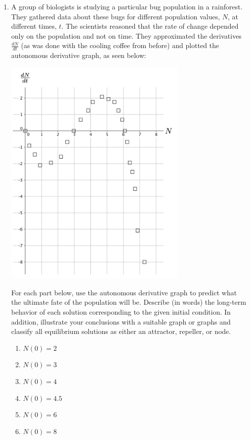 \begin{enumerate}[resume]
\item A group of biologists is studying a particular bug population in a rainforest. They gathered data about these bugs for different population values, $N$, at different times, $t$. The scientists reasoned that the rate of change depended only on the population and not on time. They approximated the derivatives $\frac{dN}{dt}$ (as was done with the cooling coffee from before) and plotted the autonomous derivative graph, as seen below: \label{07problem9}
\begin{center}
\includegraphics[width=3.5in]{07/07Bugs1.png}
\end{center}
For each part below, use the autonomous derivative graph to predict what the ultimate fate of the population will be. Describe (in words) the long-term behavior of each solution corresponding to the given initial condition. In addition, illustrate your conclusions with a suitable graph or graphs and classify all equilibrium solutions as either an attractor, repeller, or node.

\begin{enumerate}
\item	$N(0) = 2$ 
\item	$N(0) = 3$
\item	$N(0) = 4$
\item	$N(0) = 4.5$
\item	$N(0) = 6$
\item	$N(0) = 8$
\end{enumerate}


\end{enumerate}

